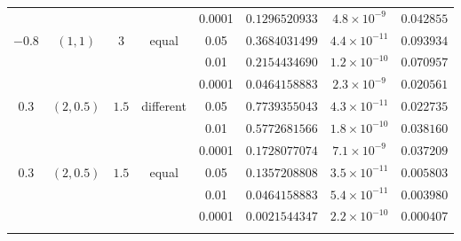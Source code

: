 \begin{table}[t]
\begin{tabular*}{\textwidth}{@{\extracolsep\fill}cccccccc@{}}
 & & & & 0.0001 & $0.1296520933$ & $4.8\times10^{-9}$ & $0.042855$\\
$-0.8$ & $(1,1)$ & $3$ & equal & 0.05 & $0.3684031499$ & $4.4\times10^{-11}$ & $0.093934$\\
 & & & & 0.01 & $0.2154434690$ & $1.2\times10^{-10}$ & $0.070957$\\
 & & & & 0.0001 & $0.0464158883$ & $2.3\times10^{-9}$ & $0.020561$\\
$0.3$ & $(2,0.5)$ & $1.5$ & different & 0.05 & $0.7739355043$ & $4.3\times10^{-11}$ & $0.022735$\\
 & & & & 0.01 & $0.5772681566$ & $1.8\times10^{-10}$ & $0.038160$\\
 & & & & 0.0001 & $0.1728077074$ & $7.1\times10^{-9}$ & $0.037209$\\
$0.3$ & $(2,0.5)$ & $1.5$ & equal & 0.05 & $0.1357208808$ & $3.5\times10^{-11}$ & $0.005803$\\
 & & & & 0.01 & $0.0464158883$ & $5.4\times10^{-11}$ & $0.003980$\\
 & & & & 0.0001 & $0.0021544347$ & $2.2\times10^{-10}$ & $0.000407$\\
\botrule
\end{tabular*}
\end{table}
